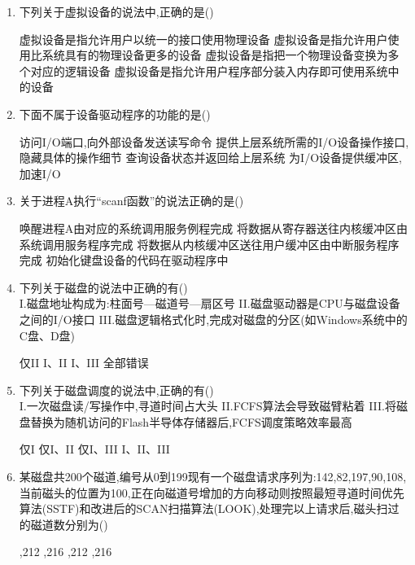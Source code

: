 \documentclass[12pt, a4paper, oneside, UTF8]{ctexbook}
\begin{document}
\begin{enumerate}
    \item 下列关于虚拟设备的说法中,正确的是(\qquad)
    \begin{choices}[1]
    \task 虚拟设备是指允许用户以统一的接口使用物理设备
    \task 虚拟设备是指允许用户使用比系统具有的物理设备更多的设备
    \task 虚拟设备是指把一个物理设备变换为多个对应的逻辑设备
    \task 虚拟设备是指允许用户程序部分装入内存即可使用系统中的设备
    \end{choices}

    \item 下面不属于设备驱动程序的功能的是(\qquad)
    \begin{choices}[1]
    \task 访问I/O端口,向外部设备发送读写命令
    \task 提供上层系统所需的I/O设备操作接口,隐藏具体的操作细节
    \task 查询设备状态并返回给上层系统
    \task 为I/O设备提供缓冲区,加速I/O
    \end{choices}

    \item 关于进程A执行“scanf函数”的说法正确的是(\qquad)
    \begin{choices}[1]
    \task 唤醒进程A由对应的系统调用服务例程完成
    \task 将数据从寄存器送往内核缓冲区由系统调用服务程序完成
    \task 将数据从内核缓冲区送往用户缓冲区由中断服务程序完成
    \task 初始化键盘设备的代码在驱动程序中
    \end{choices}

    \item 下列关于磁盘的说法中正确的有(\qquad)\\
    I.磁盘地址构成为:柱面号—磁道号—扇区号\quad
    II.磁盘驱动器是CPU与磁盘设备之间的I/O接口\quad
    III.磁盘逻辑格式化时,完成对磁盘的分区(如Windows系统中的C盘、D盘)
    \begin{choices}[2]
    \task 仅II
    \task I、II
    \task I、III
    \task 全部错误
    \end{choices}

    \item 下列关于磁盘调度的说法中,正确的有(\qquad)\\
    I.一次磁盘读/写操作中,寻道时间占大头\quad
    II.FCFS算法会导致磁臂粘着\quad
    III.将磁盘替换为随机访问的Flash半导体存储器后,FCFS调度策略效率最高
    \begin{choices}[2]
    \task 仅I
    \task 仅I、II
    \task 仅I、III
    \task I、II、III
    \end{choices}

    \item 某磁盘共200个磁道,编号从0到199现有一个磁盘请求序列为:142,82,197,90,108,当前磁头的位置为100,正在向磁道号增加的方向移动则按照最短寻道时间优先算法(SSTF)和改进后的SCAN扫描算法(LOOK),处理完以上请求后,磁头扫过的磁道数分别为(\qquad)
    \begin{choices}
    ,212
    ,216
    ,212
    ,216
    \end{choices}


\end{enumerate}
\end{document}
